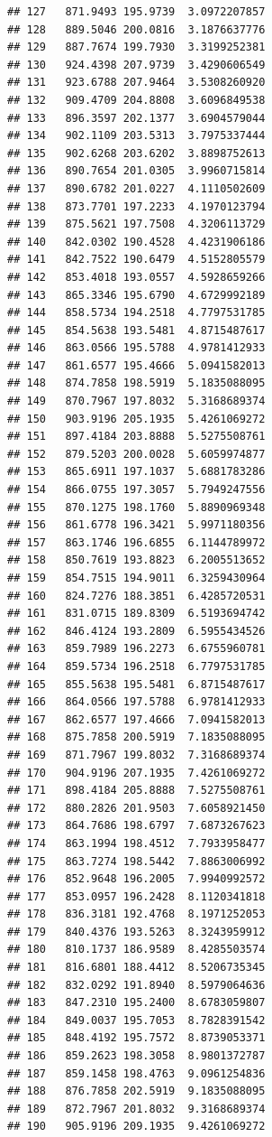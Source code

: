 \documentclass[
]{article}
\begin{document}
\begin{verbatim}
## 127   871.9493 195.9739  3.0972207857
## 128   889.5046 200.0816  3.1876637776
## 129   887.7674 199.7930  3.3199252381
## 130   924.4398 207.9739  3.4290606549
## 131   923.6788 207.9464  3.5308260920
## 132   909.4709 204.8808  3.6096849538
## 133   896.3597 202.1377  3.6904579044
## 134   902.1109 203.5313  3.7975337444
## 135   902.6268 203.6202  3.8898752613
## 136   890.7654 201.0305  3.9960715814
## 137   890.6782 201.0227  4.1110502609
## 138   873.7701 197.2233  4.1970123794
## 139   875.5621 197.7508  4.3206113729
## 140   842.0302 190.4528  4.4231906186
## 141   842.7522 190.6479  4.5152805579
## 142   853.4018 193.0557  4.5928659266
## 143   865.3346 195.6790  4.6729992189
## 144   858.5734 194.2518  4.7797531785
## 145   854.5638 193.5481  4.8715487617
## 146   863.0566 195.5788  4.9781412933
## 147   861.6577 195.4666  5.0941582013
## 148   874.7858 198.5919  5.1835088095
## 149   870.7967 197.8032  5.3168689374
## 150   903.9196 205.1935  5.4261069272
## 151   897.4184 203.8888  5.5275508761
## 152   879.5203 200.0028  5.6059974877
## 153   865.6911 197.1037  5.6881783286
## 154   866.0755 197.3057  5.7949247556
## 155   870.1275 198.1760  5.8890969348
## 156   861.6778 196.3421  5.9971180356
## 157   863.1746 196.6855  6.1144789972
## 158   850.7619 193.8823  6.2005513652
## 159   854.7515 194.9011  6.3259430964
## 160   824.7276 188.3851  6.4285720531
## 161   831.0715 189.8309  6.5193694742
## 162   846.4124 193.2809  6.5955434526
## 163   859.7989 196.2273  6.6755960781
## 164   859.5734 196.2518  6.7797531785
## 165   855.5638 195.5481  6.8715487617
## 166   864.0566 197.5788  6.9781412933
## 167   862.6577 197.4666  7.0941582013
## 168   875.7858 200.5919  7.1835088095
## 169   871.7967 199.8032  7.3168689374
## 170   904.9196 207.1935  7.4261069272
## 171   898.4184 205.8888  7.5275508761
## 172   880.2826 201.9503  7.6058921450
## 173   864.7686 198.6797  7.6873267623
## 174   863.1994 198.4512  7.7933958477
## 175   863.7274 198.5442  7.8863006992
## 176   852.9648 196.2005  7.9940992572
## 177   853.0957 196.2428  8.1120341818
## 178   836.3181 192.4768  8.1971252053
## 179   840.4376 193.5263  8.3243959912
## 180   810.1737 186.9589  8.4285503574
## 181   816.6801 188.4412  8.5206735345
## 182   832.0292 191.8940  8.5979064636
## 183   847.2310 195.2400  8.6783059807
## 184   849.0037 195.7053  8.7828391542
## 185   848.4192 195.7572  8.8739053371
## 186   859.2623 198.3058  8.9801372787
## 187   859.1458 198.4763  9.0961254836
## 188   876.7858 202.5919  9.1835088095
## 189   872.7967 201.8032  9.3168689374
## 190   905.9196 209.1935  9.4261069272

\end{verbatim}
\end{document}
